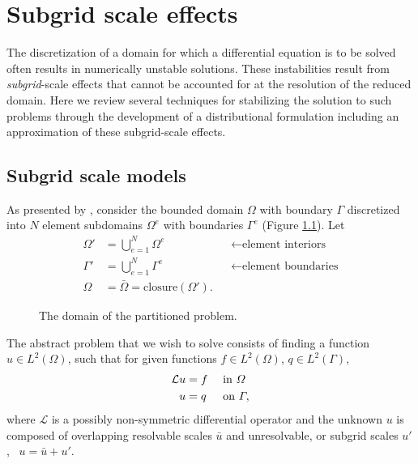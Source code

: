 
\chapter{Subgrid scale effects} \label{ssn_subgrid_scale_effects}

The discretization of a domain for which a differential equation is to be solved often results in numerically unstable solutions.  These instabilities result from \emph{subgrid}-scale effects that cannot be accounted for at the resolution of the reduced domain.  Here we review several techniques for stabilizing the solution to such problems through the development of a distributional formulation including an approximation of these subgrid-scale effects.


\section{Subgrid scale models}

As presented by \citet{hughes_1995}, consider the bounded domain $\Omega$ with boundary $\Gamma$ discretized into $N$ element subdomains $\Omega^e$ with boundaries $\Gamma^e$ (Figure \ref{subgrid_domain_image}).  Let
\begin{align*}
  \Omega' &= \bigcup_{e=1}^{N} \Omega^e  &&\leftarrow \text{element interiors} \\
  \Gamma' &= \bigcup_{e=1}^{N} \Gamma^e  &&\leftarrow \text{element boundaries} \\
  \Omega &= \bar{\Omega} = \mathrm{closure}(\Omega'). 
\end{align*}

\begin{figure}
  \centering
    \def\svgwidth{\linewidth}
    
  \caption[The discrete model]{The domain of the partitioned problem.}
  \label{subgrid_domain_image}
\end{figure}

The abstract problem that we wish to solve consists of finding a function $u \in L^2(\Omega)$, such that for given functions $f \in L^2(\Omega)$, $q \in L^2(\Gamma)$,
\begin{align}
  \label{bubble_diff_eq}
  \mathcal{L} u &= f &&\text{ in } \varOmega \\
  \label{bubble_bc}
  u &= q     &&\text{ on } \varGamma,
\end{align}
where $\mathcal{L}$ is a possibly non-symmetric differential operator and the unknown $u$ is composed of overlapping resolvable scales $\bar{u}$ and unresolvable, or subgrid scales $u'$, \ie\ $u = \bar{u} + u'$.

